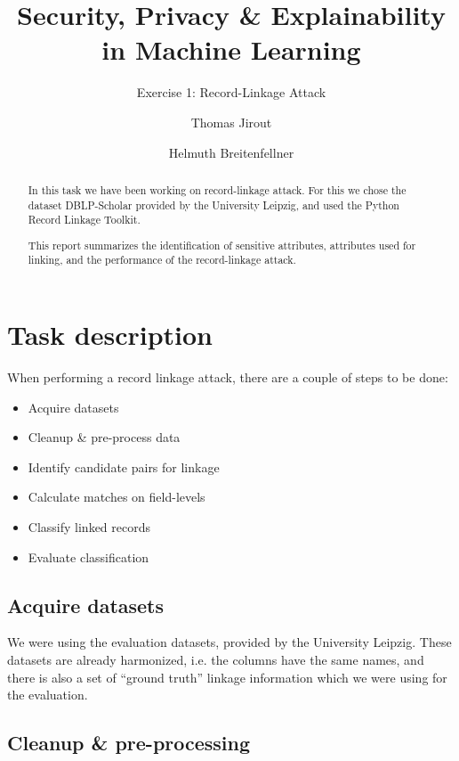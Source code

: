 \documentclass[sigconf,nonacm]{acmart}
\begin{document}
\title{Security, Privacy \& Explainability in Machine Learning}
\subtitle{Exercise 1: Record-Linkage Attack}
\author{Thomas Jirout}
\author{Helmuth Breitenfellner}
\begin{abstract}
In this task we have been working on record-linkage attack.
For this we chose the dataset DBLP-Scholar provided by the University Leipzig\cite{DataSets},\cite{kopcke2010evaluation}
and used the Python Record Linkage Toolkit\cite{de_bruin_j_2019_3559043}.

This report summarizes the identification of sensitive attributes, attributes
used for linking, and the performance of the record-linkage attack.
\end{abstract}
\maketitle
\section{Task description}

When performing a record linkage attack, there are a couple of steps
to be done:
\begin{itemize}
\item Acquire datasets
\item Cleanup \& pre-process data
\item Identify candidate pairs for linkage
\item Calculate matches on field-levels
\item Classify linked records
\item Evaluate classification
\end{itemize}

\subsection{Acquire datasets}

We were using the evaluation datasets, provided by the University Leipzig.
These datasets are already harmonized, i.e. the columns have the same names,
and there is also a set of ``ground truth'' linkage information
which we were using for the evaluation.

\subsection{Cleanup \& pre-processing}
\end{document}
